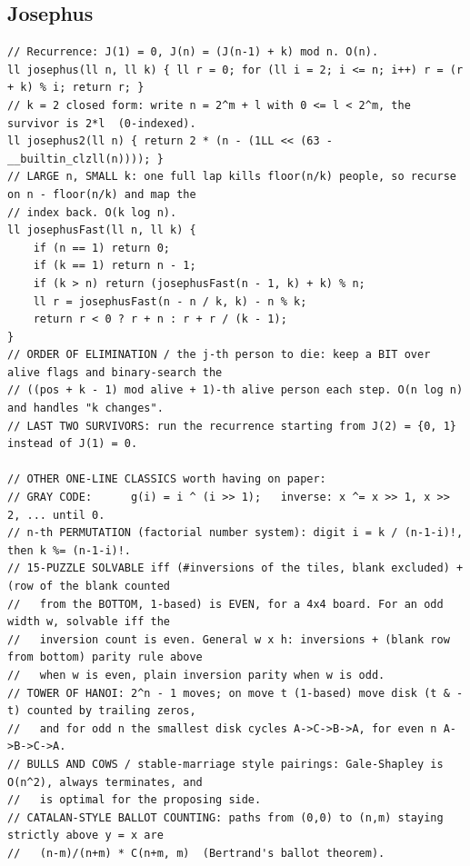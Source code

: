 \documentclass[9pt,a4paper,twocolumn]{extarticle}
\begin{document}
\subsection{Josephus}
\nopagebreak
\begin{lstlisting}
// Recurrence: J(1) = 0, J(n) = (J(n-1) + k) mod n. O(n).
ll josephus(ll n, ll k) { ll r = 0; for (ll i = 2; i <= n; i++) r = (r + k) % i; return r; }
// k = 2 closed form: write n = 2^m + l with 0 <= l < 2^m, the survivor is 2*l  (0-indexed).
ll josephus2(ll n) { return 2 * (n - (1LL << (63 - __builtin_clzll(n)))); }
// LARGE n, SMALL k: one full lap kills floor(n/k) people, so recurse on n - floor(n/k) and map the
// index back. O(k log n).
ll josephusFast(ll n, ll k) {
    if (n == 1) return 0;
    if (k == 1) return n - 1;
    if (k > n) return (josephusFast(n - 1, k) + k) % n;
    ll r = josephusFast(n - n / k, k) - n % k;
    return r < 0 ? r + n : r + r / (k - 1);
}
// ORDER OF ELIMINATION / the j-th person to die: keep a BIT over alive flags and binary-search the
// ((pos + k - 1) mod alive + 1)-th alive person each step. O(n log n) and handles "k changes".
// LAST TWO SURVIVORS: run the recurrence starting from J(2) = {0, 1} instead of J(1) = 0.

// OTHER ONE-LINE CLASSICS worth having on paper:
// GRAY CODE:      g(i) = i ^ (i >> 1);   inverse: x ^= x >> 1, x >> 2, ... until 0.
// n-th PERMUTATION (factorial number system): digit i = k / (n-1-i)!, then k %= (n-1-i)!.
// 15-PUZZLE SOLVABLE iff (#inversions of the tiles, blank excluded) + (row of the blank counted
//   from the BOTTOM, 1-based) is EVEN, for a 4x4 board. For an odd width w, solvable iff the
//   inversion count is even. General w x h: inversions + (blank row from bottom) parity rule above
//   when w is even, plain inversion parity when w is odd.
// TOWER OF HANOI: 2^n - 1 moves; on move t (1-based) move disk (t & -t) counted by trailing zeros,
//   and for odd n the smallest disk cycles A->C->B->A, for even n A->B->C->A.
// BULLS AND COWS / stable-marriage style pairings: Gale-Shapley is O(n^2), always terminates, and
//   is optimal for the proposing side.
// CATALAN-STYLE BALLOT COUNTING: paths from (0,0) to (n,m) staying strictly above y = x are
//   (n-m)/(n+m) * C(n+m, m)  (Bertrand's ballot theorem).
\end{lstlisting}
\end{document}
